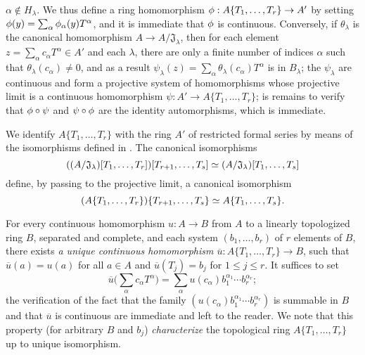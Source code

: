 \begin{env}[7.5.1]
$\alpha\not\in H_\lambda$. We thus define a ring homomorphism
$\vphi:A\{T_1,\dots,T_r\}\to A'$ by setting
$\phi(y)=\sum_\alpha\phi_\alpha(y)T^\alpha$, and it is immediate that $\phi$ is
continuous. Conversely, if $\theta_\lambda$ is the canonical homomorphism
$A\to A/\mathfrak{J}_\lambda$, then for each element
$z=\sum_\alpha c_\alpha T^\alpha\in A'$ and each $\lambda$, there are only a finite
number of indices $\alpha$ such that $\theta_\lambda(c_\alpha)\neq 0$, and as a
result $\psi_\lambda(z)=\sum_\alpha\theta_\lambda(c_\alpha)T^\alpha$ is in
$B_\lambda$; the $\psi_\lambda$ are continuous and form a projective system of
homomorphisms whose projective limit is a continuous homomorphism
$\psi:A'\to A\{T_1,\dots,T_r\}$; is remains to verify that $\phi\circ\psi$ and
$\psi\circ\phi$ are the identity automorphisms, which is immediate.
\end{env}

\begin{env}[7.5.2]
\label{0.7.5.2}
We identify $A\{T_1,\dots,T_r\}$ with the ring $A'$ of restricted formal series by
means of the isomorphisms defined in . The canonical
isomorphisms
\[
  ((A/\mathfrak{J}_\lambda)[T_1,\dots,T_r])[T_{r+1},\dots,T_s]
  \simeq(A/\mathfrak{J}_\lambda)[T_1,\dots,T_s]
\]
define, by passing to the projective limit, a canonical isomorphism
\[
  (A\{T_1,\dots,T_r\})\{T_{r+1},\dots,T_s\}
  \simeq A\{T_1,\dots,T_s\}.
\]
\end{env}

\begin{env}[7.5.3]
\label{0.7.5.3}
For every continuous homomorphism $u:A\to B$ from $A$ to a linearly topologized ring
$B$, separated and complete, and each system $(b_1,\dots,b_r)$ of $r$ elements of $B$,
there exists \emph{a unique continuous homomorphism $\overline{u}:A\{T_1,\dots,T_r\}\to B$},
such that $\overline{u}(a)=u(a)$ for all $a\in A$ and $\overline{u}(T_j)=b_j$ for
$1\leq j\leq r$. It suffices to set
\[
  \overline{u}\big(\sum_\alpha c_\alpha T^\alpha\big)
  =\sum_\alpha u(c_\alpha)b_1^{\alpha_1}\cdots b_r^{\alpha_r};
\]
the verification of the fact that the family $(u(c_\alpha)b_1^{\alpha_1}\cdots b_r^{\alpha_r})$
is summable in $B$ and that $\overline{u}$ is continuous are immediate and left to the
reader. We note that this property (for arbitrary $B$ and $b_j$) \emph{characterize} the
topological ring $A\{T_1,\dots,T_r\}$ up to unique isomorphism.
\end{env}

